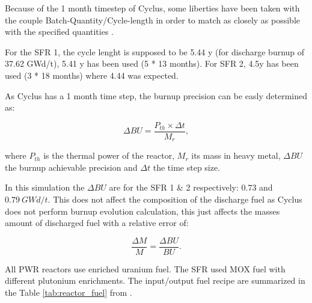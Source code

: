 \documentclass[12pt]{article}
\begin{document}
Because of the 1 month timestep of Cyclus, some liberties have been taken with
the couple Batch-Quantity/Cycle-length in order to match as closely as
possible with the specified quantities \cite{REF-F.Bo}.

For the SFR 1, the cycle lenght is supposed to be 5.44 y (for discharge burnup
of 37.62 GWd/t), 5.41 y has been used (5 * 13 months). For SFR 2, 4.5y has
been used (3 * 18 months) where 4.44 was expected.

As Cyclus has a 1 month time step, the
burnup precision can be easly determined as:

\begin{equation}
  \Delta BU = \frac{P_{th} \times \Delta t}{M_{r}},
\end{equation}

\noindent where $P_{th}$ is the thermal power of the reactor, $M_{r}$ its mass
in heavy metal, $\Delta BU$ the burnup achievable precision and $\Delta t$ the
time step size.

In this simulation the $\Delta BU$ are for the SFR 1 \& 2 respectively: $0.73$
and $0.79~GWd/t$.  This does not affect the composition of the discharge fuel
as Cyclus does not perform burnup evolution calculation, this just affects the
masses amount of discharged fuel with a relative error of:

\begin{equation}
  \frac{\Delta M}{M} = \frac{\Delta BU}{BU}.
\end{equation}

All PWR reactors use enriched uranium fuel. The SFR used MOX fuel with
different plutonium enrichments. The input/output fuel recipe are summarized
in the Table \ref{tab:reactor_fuel} from \cite{B.Feng_calculation}.
\end{document}
